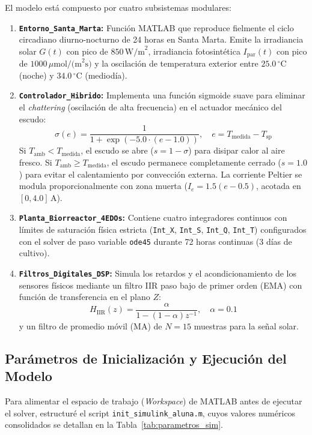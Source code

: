 El modelo está compuesto por cuatro subsistemas modulares:
\begin{enumerate}
    \item \textbf{\texttt{Entorno\_Santa\_Marta}:} Función MATLAB que reproduce fielmente el ciclo circadiano diurno-nocturno de 24 horas en Santa Marta. Emite la irradiancia solar $G(t)$ con pico de $850\,\text{W/m}^2$, irradiancia fotosintética $I_{\text{par}}(t)$ con pico de $1000\,\mu\text{mol/(m}^2\text{s)}$ y la oscilación de temperatura exterior entre $25.0\,^\circ\text{C}$ (noche) y $34.0\,^\circ\text{C}$ (mediodía).
    
    \item \textbf{\texttt{Controlador\_Hibrido}:} Implementa una función sigmoide suave para eliminar el \textit{chattering} (oscilación de alta frecuencia) en el actuador mecánico del escudo:
    \begin{equation}
        \sigma(e) = \frac{1}{1 + \exp\left( -5.0 \cdot (e - 1.0) \right)}, \quad e = T_{\text{medida}} - T_{\text{sp}}
    \end{equation}
    Si $T_{\text{amb}} < T_{\text{medida}}$, el escudo se abre ($s = 1 - \sigma$) para disipar calor al aire fresco. Si $T_{\text{amb}} \ge T_{\text{medida}}$, el escudo permanece completamente cerrado ($s = 1.0$) para evitar el calentamiento por convección externa. La corriente Peltier se modula proporcionalmente con zona muerta ($I_e = 1.5(e - 0.5)$, acotada en $[0, 4.0]\,\text{A}$).

    \item \textbf{\texttt{Planta\_Biorreactor\_4EDOs}:} Contiene cuatro integradores continuos con límites de saturación física estricta (\texttt{Int\_X}, \texttt{Int\_S}, \texttt{Int\_Q}, \texttt{Int\_T}) configurados con el solver de paso variable \texttt{ode45} durante 72 horas continuas (3 días de cultivo).

    \item \textbf{\texttt{Filtros\_Digitales\_DSP}:} Simula los retardos y el acondicionamiento de los sensores físicos mediante un filtro IIR paso bajo de primer orden (EMA) con función de transferencia en el plano $Z$:
    \begin{equation}
        H_{\text{IIR}}(z) = \frac{\alpha}{1 - (1 - \alpha)z^{-1}}, \quad \alpha = 0.1
    \end{equation}
    y un filtro de promedio móvil (MA) de $N=15$ muestras para la señal solar.
\end{enumerate}

\subsection{Parámetros de Inicialización y Ejecución del Modelo}
Para alimentar el espacio de trabajo (\textit{Workspace}) de MATLAB antes de ejecutar el solver, estructuré el script \texttt{init\_simulink\_aluna.m}, cuyos valores numéricos consolidados se detallan en la Tabla~\ref{tab:parametros_sim}.

